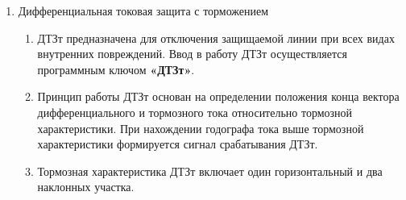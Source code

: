 \begin{enumerate}
\begin{enumerate}
\item Действующее значение тормозного тока первой гармоники рассчитывается как полусумма модулей токов по концам защищаемой линии:
  \begin{align}
    I_\textit{*Т}=0,5 \cdot (\mid \dot{I}_\textit{*В1}^\textit{(А)} \mid + \mid \dot{I}_\textit{*B2}^\textit{(А)} \mid + \mid \dot{I}_\textit{*B1}^\textit{(Б)} \mid + \mid \dot{I}_\textit{*B2}^\textit{(Б)} \mid + \mid \dot{I}_\textit{*B1}^\textit{(В)} \mid + \mid \dot{I}_\textit{*B2}^\textit{(В)} \mid),
  \end{align}
\item Измерительные органы ДЗЛ представлены на рисунке \ref{pict_dzl:IO_DZL}.
\item Параметры для настройки ИО ДЗЛ представлены в таблице \ref{app_set:dzl}.
\end{enumerate}

\item Дифференциальная токовая защита с торможением

\begin{enumerate}

\item ДТЗт предназначена для отключения защищаемой линии при всех видах внутренних повреждений. Ввод в работу ДТЗт осуществляется программным ключом \textbf{«ДТЗт»}.

\item Принцип работы ДТЗт основан на определении положения конца вектора дифференциального и тормозного тока относительно тормозной характеристики. При нахождении годографа тока выше тормозной характеристики формируется сигнал срабатывания ДТЗт.

\item Тормозная характеристика ДТЗт включает один горизонтальный и два наклонных участка.


\end{enumerate}
\end{enumerate}
